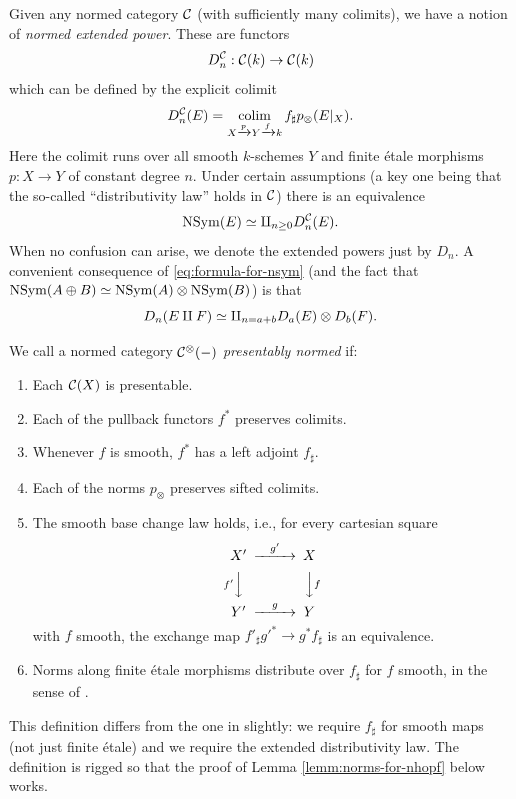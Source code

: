 \documentclass{amsart}
\numberwithin{proposition}{section}
\numberwithin{equation}{section}
\def\NSym{\mathrm{NSym}}
\begin{document}
Given any normed category $\mathcal C$ (with sufficiently many colimits), we have a notion of \emph{normed extended power}.
These are functors \[ D_n^{\mathcal C}: \mathcal C(k) \to \mathcal C(k) \] which can be defined by the explicit colimit \cite[Definition~5.6 and Example~5.8]{bachmann-colimits} \begin{equation} \label{eq:formula-for-dn} D_n^{\mathcal C}(E) = \operatorname*{colim}_{X \xrightarrow{p} Y \xrightarrow{f} k} f_\sharp p_\otimes(E|_X). \end{equation}
Here the colimit runs over all smooth $k$-schemes $Y$ and finite étale morphisms $p: X \to Y$ of constant degree $n$.
Under certain assumptions (a key one being that the so-called ``distributivity law'' \cite[\S5.2]{bachmann-norms} holds in $\mathcal C$) there is an equivalence \cite[Theorem~3.10]{bachmann-MGM} \begin{equation} \label{eq:formula-for-nsym} \NSym(E) \wequi \amalg_{n \ge 0} D_n^{\scr C}(E). \end{equation}
When no confusion can arise, we denote the extended powers just by $D_n$.
A convenient consequence of \eqref{eq:formula-for-nsym} (and the fact that $\NSym(A \oplus B) \wequi \NSym(A) \otimes \NSym(B)$) is that \begin{equation} \label{eq:formula-for-Dn-sum} D_n(E \amalg F) \simeq \amalg_{n = a + b} D_a(E) \otimes D_b(F). \end{equation}

\begin{definition}
We call a normed category $\mathcal C^\otimes(\mathord-)$ \emph{presentably normed} if:
\begin{enumerate}
\item Each $\mathcal C(X)$ is presentable.
\item Each of the pullback functors $f^*$ preserves colimits.
\item Whenever $f$ is smooth, $f^*$ has a left adjoint $f_\sharp$.
\item Each of the norms $p_\otimes$ preserves sifted colimits.
\item The smooth base change law holds, i.e., for every cartesian square
  \[
  \begin{CD}
  X' @>{g'}>> X \\
  @V{f'}VV @VV{f}V \\
  Y' @>{g}>> Y
  \end{CD}
  \]
  with $f$ smooth, the exchange map $f'_\sharp g'^* \to g^*f_\sharp$ is an equivalence.
\item Norms along finite étale morphisms distribute over $f_\sharp$ for $f$ smooth, in the sense of \cite[\S5.2]{bachmann-norms}.
\end{enumerate}
\end{definition}
\begin{remark}
This definition differs from the one in \cite[Definition 6.5]{bachmann-norms} slightly: we require $f_\sharp$ for smooth maps (not just finite étale) and we require the extended distributivity law.
The definition is rigged so that the proof of Lemma \ref{lemm:norms-for-nhopf} below works.
\end{remark}
\end{document}

